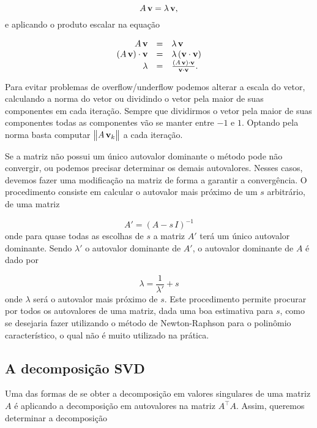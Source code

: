 \begin{equation*}
A\,{\bf v}=\lambda\,{\bf v},
\end{equation*}
e aplicando o produto escalar na equação

\begin{equation*}
\begin{array}{rcl}
A\,{\bf v}&=&\lambda\,{\bf v}\\
(A\,{\bf v})\cdot{\bf v}&=&\lambda\,({\bf v}\cdot{\bf v})\\
\lambda&=&\frac{(A\,{\bf v})\cdot{\bf v}}{{\bf v}\cdot{\bf v}}.
\end{array}
\end{equation*}

Para evitar problemas de overflow/underflow podemos alterar a escala do vetor, calculando a norma do vetor ou dividindo o vetor pela maior de suas componentes em cada iteração. Sempre que dividirmos o vetor pela maior de suas componentes todas as componentes vão se manter entre $-1$ e $1$. Optando pela norma basta computar $\begin{Vmatrix}A\,{\bf v}_k\end{Vmatrix}$ a cada iteração. 


Se a matriz não possui um único autovalor dominante o método pode não convergir, ou podemos precisar determinar os demais autovalores. Nesses casos, devemos fazer uma modificação na matriz de forma a garantir a convergência. O procedimento consiste em calcular o autovalor mais próximo de um $s$ arbitrário, de uma matriz

\begin{equation*}
A'=(A-s\,I)^{-1}
\end{equation*}
onde para quase todas as escolhas de $s$ a matriz $A'$ terá um único autovalor dominante. Sendo $\lambda'$ o autovalor dominante de $A'$, o autovalor dominante de $A$ é dado por

\begin{equation*}
\lambda=\frac{1}{\lambda'}+s
\end{equation*} 
onde $\lambda$ será o autovalor mais próximo de $s$. Este procedimento permite procurar por todos os autovalores de uma matriz, dada uma boa estimativa para $s$, como se desejaria fazer utilizando o método de Newton-Raphson para o polinômio característico, o qual não é muito utilizado na prática.

\subsection{A decomposição SVD}\label{sec.SVD}
Uma das formas de se obter a decomposição em valores singulares de uma matriz $A$ é aplicando a decomposição em autovalores na matriz  $A^\top A$. Assim, queremos determinar a decomposição

